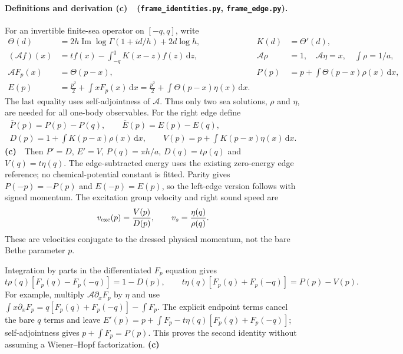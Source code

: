 \documentclass[11pt,a4paper]{article}
\newcommand{\Lc}{\textbf{(c)}\ }
\newcommand{\dd}{\mathrm d}
\newcommand{\id}{\texttt{frame\_\allowbreak identities.py}}
\newcommand{\ed}{\texttt{frame\_\allowbreak edge.py}}
\begin{document}
\paragraph{Definitions and derivation \Lc\ (\id, \ed).}
For an invertible finite-sea operator on $[-q,q]$, write
\begin{align}
 \Theta(d)&=2h\operatorname{Im}\log\Gamma(1+id/h)+2d\log h,
 &K(d)&=\Theta'(d),\\
 (\mathcal Af)(x)&=tf(x)-\int_{-q}^q K(x-z)f(z)\,\dd z,
 &\mathcal A\rho&=1,\quad \mathcal A\eta=x,\quad \int\rho=1/a,\\
 \mathcal AF_p(x)&=\Theta(p-x),&
 P(p)&=p+\int\Theta(p-x)\rho(x)\,\dd x,\\
 E(p)&=\frac{p^2}{2}+\int xF_p(x)\,\dd x
       =\frac{p^2}{2}+\int\Theta(p-x)\eta(x)\,\dd x .
 \label{eq:fredholm}
\end{align}
The last equality uses self-adjointness of $\mathcal A$. Thus only two sea
solutions, $\rho$ and $\eta$, are needed for all one-body observables.
For the right edge define
\begin{equation}
 \begin{gathered}
 \overline P(p)=P(p)-P(q),\qquad \overline E(p)=E(p)-E(q),\\
 D(p)=1+\int K(p-x)\rho(x)\,\dd x,\qquad
 V(p)=p+\int K(p-x)\eta(x)\,\dd x .
 \end{gathered}
 \label{eq:DV}
\end{equation}
\Lc\ Then $P'=D$, $E'=V$, $P(q)=\pi h/a$,
$D(q)=t\rho(q)$ and $V(q)=t\eta(q)$. The edge-subtracted energy uses the
existing zero-energy edge reference; no chemical-potential constant is fitted.
Parity gives $P(-p)=-P(p)$ and $E(-p)=E(p)$, so the left-edge version follows
with signed momentum. The excitation group velocity and right sound speed are
\begin{equation}
 v_{\rm exc}(p)=\frac{V(p)}{D(p)},\qquad
 v_s=\frac{\eta(q)}{\rho(q)}.
 \label{eq:velocity}
\end{equation}
These are velocities conjugate to the dressed physical momentum, not the
bare Bethe parameter $p$.

Integration by parts in the differentiated $F_p$ equation gives
\begin{equation}
 \boxed{t\rho(q)[F_p(q)-F_p(-q)]=1-D(p),\qquad
 t\eta(q)[F_p(q)+F_p(-q)]=P(p)-V(p).}
 \label{eq:newenergy}
\end{equation}
For example, multiply $\mathcal A\partial_xF_p$ by $\eta$ and use
$\int x\partial_xF_p=q[F_p(q)+F_p(-q)]-\int F_p$.
The explicit endpoint terms cancel the bare $q$ terms and leave
$E'(p)=p+\int F_p-t\eta(q)[F_p(q)+F_p(-q)]$; self-adjointness gives
$p+\int F_p=P(p)$. This proves the second identity without assuming a
Wiener--Hopf factorization. \Lc
\end{document}
